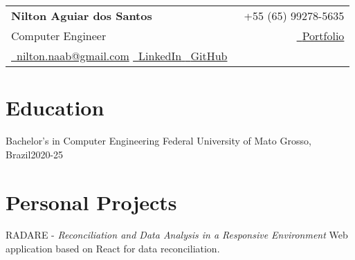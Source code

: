 

\newcommand{\name}{Nilton Aguiar dos Santos} %
\newcommand{\course}{Computer Engineering} %
\newcommand{\phone}{+55 (65) 99278-5635} %
\newcommand{\emaila}{nilton.naab@gmail.com} %
\newcommand{\github}{https://github.com/notNilton} %
\newcommand{\linkedin}{https://www.linkedin.com/in/notnilton/} %
\newcommand{\portfolio}{https://github.com/notNilton} %



\selectfont

{
\begin{tabularx}{\linewidth}{L r} \\
    \textbf{\Large \name} & {\raisebox{0.0\height}{\footnotesize \faPhone}\ \phone}
    \\
    {Computer Engineer}
    &
    \href{\portfolio}{\raisebox{0.0\height}{\footnotesize \faGlobe}\ {Portfolio}}
    \\
    \href{mailto:\emaila} {\raisebox{0.0\height}{\footnotesize \faEnvelope}\ {\emaila}}
    \href{\linkedin}{\raisebox{0.0\height}{\footnotesize \faLinkedin}\ {LinkedIn} }
    \href{\github}{\raisebox{0.0\height}{\footnotesize \faGithub}\ {GitHub} }
\end{tabularx}
}

\section{\textbf{Education}}
    \resumeSubHeadingListStart
    \resumeSubheading
    {Bachelor’s in Computer Engineering}{}
    {Federal University of Mato Grosso, Brazil}{2020-25}
    \resumeSubHeadingListEnd
\vspace{-5.5mm}

\section{\textbf{Personal Projects}}
\resumeSubHeadingListStart
    \resumeProject
      { RADARE - \textit{Reconciliation and Data Analysis in a Responsive Environment}}
      {Web application based on React for data reconciliation.}
      {}

